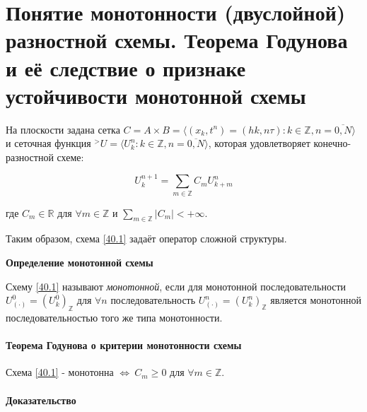 \documentclass[__main__.tex]{subfiles}
\begin{document}
\section{Понятие монотонности (двуслойной) разностной схемы. Теорема Годунова и её следствие о признаке устойчивости монотонной схемы}

На плоскости задана сетка $C = A \times B = \langle \left(x_k,t^n\right) = \left(hk,n\tau\right):k \in \mathbb{Z}, n = \overline{0,N} \rangle$ и сеточная функция ${}^>U = \langle U^n_k: k \in \mathbb{Z}, n = \overline{0,N} \rangle$, которая удовлетворяет конечно-разностной схеме:

\begin{equation}\label{40.1}
U^{n+1}_k = \sum_{m\in \mathbb{Z}} C_m U^n_{k+m}
\end{equation}

где $C_m \in \mathbb{R}$ для $\forall m \in \mathbb{Z}$ и $\sum_{m\in \mathbb{Z}} \left| C_m \right| < + \infty$.

Таким образом, схема \ref{40.1} задаёт оператор сложной структуры.

\textbf{Определение монотонной схемы}

Схему \ref{40.1} называют \textit{монотонной}, если для монотонной последовательности $U^0_{(\cdot)} = \left( U^0_k \right)_{\mathbb{Z}}$ для $\forall n$ последовательность $U^n_{(\cdot)} = \left( U^n_k \right)_{\mathbb{Z}}$ является монотонной последовательностью того же типа монотонности.

\paragraph{Теорема Годунова о критерии монотонности схемы}
	Схема \ref{40.1} - монотонна $\Leftrightarrow \ C_m \geq 0$ для $\forall m \in \mathbb{Z}$.
	
\paragraph{Доказательство}
\end{document}

